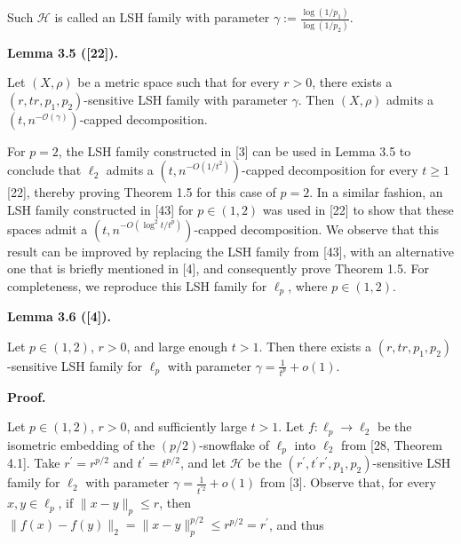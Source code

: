 Such $\mathcal{H}$ is called an LSH family with parameter $\gamma:=\frac{\log(1/p_{1})}{\log(1/p_{2})}$.
\par
\par
\par
\par\medskip\noindent\textbf{Lemma 3.5 ([22]).}\par
Let $(X,\rho)$ be a metric space such that for every $r>0$, there exists a $(r,tr,p_{1},p_{2})$-sensitive LSH family with parameter $\gamma$. Then $(X,\rho)$ admits a $(t,n^{-\mathcal{O}(\gamma)})$-capped decomposition.
\par
\par
\par
For $p=2$, the LSH family constructed in [3] can be used in Lemma 3.5 to conclude that $\ell_{2}$ admits a $(t,n^{-O(1/t^{2})})$-capped decomposition for every $t\geq 1$ [22], thereby proving Theorem 1.5 for this case of $p=2$. In a similar fashion, an LSH family constructed in [43] for $p\in(1,2)$ was used in [22] to show that these spaces admit a $(t,n^{-O(\log^{2}{t}/t^{p})})$-capped decomposition. We observe that this result can be improved by replacing the LSH family from [43], with an alternative one that is briefly mentioned in [4], and consequently prove Theorem 1.5. For completeness, we reproduce this LSH family for $\ell_{p}$, where $p\in(1,2)$.
\par
\par
\par\medskip\noindent\textbf{Lemma 3.6 ([4]).}\par
Let $p\in(1,2)$, $r>0$, and large enough $t>1$. Then there exists a $(r,tr,p_{1},p_{2})$-sensitive LSH family for $\ell_{p}$ with parameter $\gamma=\frac{1}{t^{p}}+o(1)$.
\par
\par
\par
\par\medskip\noindent\textbf{Proof.}\par
Let $p\in(1,2)$, $r>0$, and sufficiently large $t>1$. Let $f:\ell_{p}\to\ell_{2}$ be the isometric embedding of the $(p/2)$-snowflake of $\ell_{p}$ into $\ell_{2}$ from [28, Theorem 4.1]. Take $r^{\prime}=r^{p/2}$ and $t^{\prime}=t^{p/2}$, and let $\mathcal{H}$ be the $(r^{\prime},t^{\prime}r^{\prime},p_{1},p_{2})$-sensitive LSH family for $\ell_{2}$ with parameter $\gamma=\frac{1}{t^{\prime 2}}+o(1)$ from [3]. Observe that, for every $x,y\in\ell_{p}$, if $\|x-y\|_{p}\leq r$, then $\|f(x)-f(y)\|_{2}=\|x-y\|_{p}^{p/2}\leq r^{p/2}=r^{\prime}$, and thus
\par
